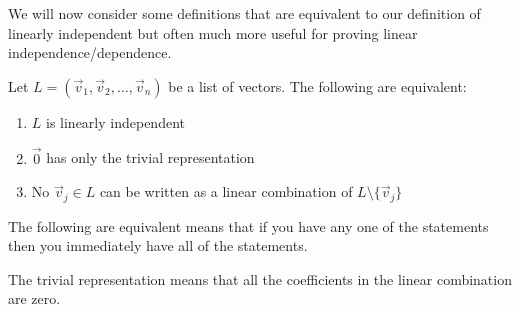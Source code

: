 We will now consider some definitions that are equivalent to our definition of linearly independent but often much more useful for proving linear independence/dependence.
\begin{theorem}
    Let $L=(\vec{v}_1,\vec{v}_2,\ldots,\vec{v}_n)$ be a list of vectors. The following are equivalent:
    \begin{enumerate}
        \item $L$ is linearly independent
        \item $\vec{0}$ has only the trivial representation
        \item No $\vec{v}_j\in L$ can be written as a linear combination of $L\setminus\{\vec{v}_j\}$
    \end{enumerate}
\end{theorem}
\begin{remark}
    The following are equivalent means that if you have any one of the statements then you immediately have all of the statements.
\end{remark}
\begin{remark}
    The trivial representation means that all the coefficients in the linear combination are zero.
\end{remark}

